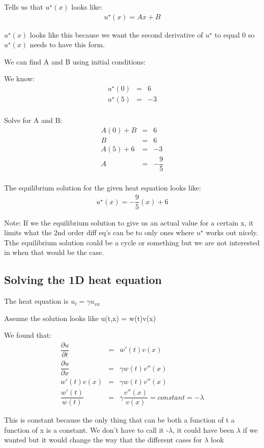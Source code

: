 \documentclass{article}
\newcommand{\bea}{\begin{eqnarray*}}
\newcommand{\eea}{\end{eqnarray*}}
\newcommand{\blue}[1]{\textcolor{blue}{#1}}
\begin{document}
Tells us that $u^{\star}(x)$ looks like:
\bea
u^{\star}(x) = Ax + B
\eea

$u^{\star}(x)$ looks like this because we want the second derivative of $u^{\star}$ to equal 0 so $u^{\star}(x)$ needs to have this form. 

We can find A and B using initial conditions:

We know:
\bea
u^{\star}(0) &=& 6 \\
u^{\star}(5) &=& -3 \\
\eea

Solve for A and B:
\bea
A(0) + B &=& 6\\
B &=& 6 \\
A(5) + 6 &=& -3 \\
A &=& -\dfrac{9}{5} \\
\eea

The equilibrium solution for the given heat equation looks like:
\bea
u^{\star}(x)=-\dfrac{9}{5}(x) + 6
\eea

Note: If we the equilibrium solution to give us an actual value for a certain x, it limits what the 2nd order diff eq's can be to only ones where $u^{\star}$ works out nicely. Tthe equilibrium solution could be a cycle or something but we are not interested in when that would be the case. 

\subsection{Solving the 1D heat equation}
The heat equation is $u_t = \gamma u_{xx}$

Assume the solution looks like u(t,x) = w(t)v(x)

We found that:
\bea
\dfrac{\partial u}{\partial t} &=& w'(t)v(x) \\
\dfrac{\partial u}{\partial x} &=& \gamma w(t)v''(x) \\
w'(t)v(x) &=& \gamma w(t)v''(x) \\
\dfrac{w'(t)}{w(t)} &=& \gamma \dfrac{v''(x)}{v(x)} = constant = -\lambda
\eea

This is constant because the only thing that can be both a function of t a function of x is a constant. We don't have to call it -$\lambda$, it could have been $\lambda$ if we wanted but it would change the way that the different cases for $\lambda$ look \newline
\end{document}
